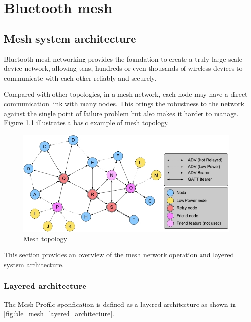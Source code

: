 \documentclass[\main/main.tex]{subfiles}
\begin{document}
\graphicspath{{img/}{ble_mesh/img/}}

\chapter{Bluetooth mesh}

\section{Mesh system architecture}

Bluetooth mesh networking provides the foundation to create a truly large-scale device network, allowing tens, hundreds or even thousands of wireless devices to communicate with each other reliably and securely.

Compared with other topologies, in a mesh network, each node may have a direct communication link with many nodes. This brings the robustness to the network against the single point of failure problem but also makes it harder to manage. Figure \ref{fig:Mesh topology} illustrates a basic example of mesh topology.

\begin{figure}[H]
    \begin{center}
        \includegraphics[scale=0.7]{mesh_topology.jpg}
    \end{center}
    \caption{Mesh topology}
    \label{fig:Mesh topology}
\end{figure}

This section provides an overview of the mesh network operation and layered system architecture.
\subsection{Layered architecture}
The Mesh Profile specification is defined as a layered architecture as shown in \ref{fig:ble_mesh_layered_architecture}.
\end{document}
